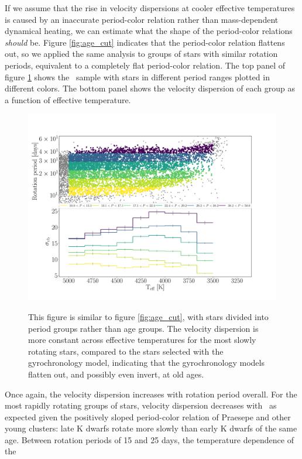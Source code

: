 If we assume that the rise in velocity dispersions at cooler effective
temperatures is caused by an inaccurate period-color relation rather than
mass-dependent dynamical heating, we can estimate what the shape of the
period-color relations {\it should} be.
Figure \ref{fig:age_cut} indicates that the period-color relation flattens
out, so we applied the same analysis to groups of stars with similar rotation
periods, equivalent to a completely flat period-color relation.
The top panel of figure \ref{fig:period_cut} shows the \mct\ sample with stars
in different period ranges plotted in different colors.
The bottom panel shows the velocity dispersion of each group as a function of
effective temperature.
\begin{figure}
  \caption{
This figure is similar to figure \ref{fig:age_cut}, with stars divided into
    period groups rather than age groups.
The velocity dispersion is more constant across effective temperatures for the
    most slowly rotating stars, compared to the stars selected with the
    \citet{angus2019} gyrochronology model, indicating that the gyrochronology
    models flatten out, and possibly even invert, at old ages.
}
  \centering
    \includegraphics[width=1\textwidth]{period_cut}
\label{fig:period_cut}
\end{figure}
Once again, the velocity dispersion increases with rotation period overall.
For the most rapidly rotating groups of stars, velocity dispersion decreases
with \teff\ as expected given the positively sloped period-color relation of
Praesepe and other young clusters: late K dwarfs rotate more slowly than early
K dwarfs of the same age.
Between rotation periods of 15 and 25 days, the temperature dependence of the
